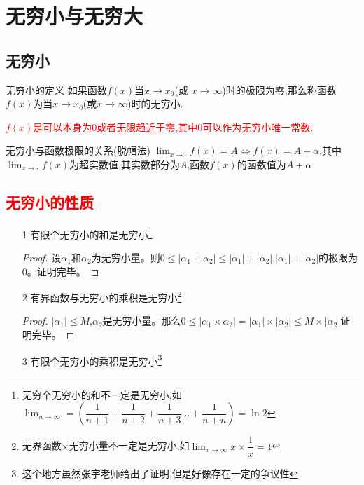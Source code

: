 \documentclass[9pt a4paper, oneside, UTF8]{ctexbook}
\begin{document}
\begin{sloppypar}
    \section{无穷小与无穷大}
    \subsection{无穷小}
    \begin{defn}{无穷小的定义}{}
        如果函数$f(x)$当$x\to x_0$(或 $x\to\infty$)时的极限为零,那么称函数$f(x)$为当$x\to x_0$(或$x\to\infty$)时的无穷小.
    \end{defn}
    \textcolor{red}{$f(x)$是可以本身为$0$或者无限趋近于零,其中$0$可以作为无穷小唯一常数}.
    \begin{criterion}{无穷小与函数极限的关系(脱帽法)}{}
        $\lim_{x\to\cdot}f(x)=A\Leftrightarrow f(x)=A+\alpha$,其中$\lim_{x\to\cdot}f(x)$为超实数值,其实数部分为$A$,函数$f(x)$的函数值为$A+\alpha$\label{wqx1}
    \end{criterion}
    \subsection{\textcolor{red}{无穷小的性质}}
    \begin{itemize}
        \item[1] 有限个无穷小的和是无穷小\footnote{无穷个无穷小的和不一定是无穷小,如$\lim_{n \to \infty}=(\dfrac{1}{n+1}+\dfrac{1}{n+2}+\dfrac{1}{n+3}\dots +\dfrac{1}{n+n})=\ln 2$}
            \begin{proof}
                设$\alpha_1$和$\alpha_2$为无穷小量。则$0 \leqslant |\alpha_1+\alpha_2|\leqslant |\alpha_1|+|\alpha_2|$,$|\alpha_1|+|\alpha_2|$的极限为0。证明完毕。
            \end{proof}
        \item[2] 有界函数与无穷小的乘积是无穷小\footnote{无界函数$\times$无穷小量不一定是无穷小,如$\lim_{x \to \infty}x \times \dfrac{1}{x}=1$}
            \begin{proof}
                $|\alpha _1|\leqslant M$,$\alpha_2$是无穷小量。那么$0\leqslant|\alpha_1 \times \alpha_2|=|\alpha_1|\times |\alpha_2|\leqslant M \times |\alpha_2|$证明完毕。
            \end{proof}
        \item[3] 有限个无穷小的乘积是无穷小\footnote{这个地方虽然张宇老师给出了证明,但是好像存在一定的争议性}
    \end{itemize}

\end{sloppypar}
\end{document}
